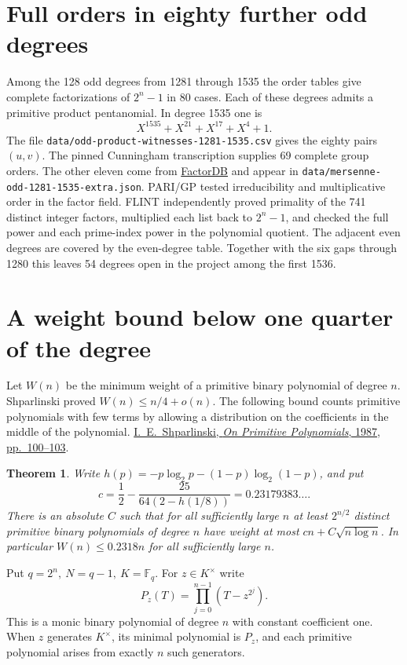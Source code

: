 \documentclass[11pt]{article}
\newtheorem{theorem}{Theorem}
\begin{document}
\section{Full orders in eighty further odd degrees}\label{sec:odd-1535}
Among the 128 odd degrees from 1281 through 1535 the order tables
give complete factorizations of \(2^n-1\) in 80 cases. Each of these
degrees admits a primitive product pentanomial. In degree 1535 one is
\[
                   X^{1535}+X^{21}+X^{17}+X^4+1 .
\]
The file \nolinkurl{data/odd-product-witnesses-1281-1535.csv} gives the
eighty pairs \((u,v)\). The pinned Cunningham transcription supplies
69 complete group orders. The other eleven come from
\href{https://factordb.com/index.php?query=2%5E1535-1}{FactorDB}
and appear in \nolinkurl{data/mersenne-odd-1281-1535-extra.json}.
PARI/GP tested irreducibility and multiplicative order in the factor
field. FLINT independently proved primality of the 741 distinct
integer factors, multiplied each list back to \(2^n-1\), and checked
the full power and each prime-index power in the polynomial quotient.
The adjacent even degrees are covered by the even-degree table.
Together with the six gaps through 1280 this leaves 54 degrees open
in the project among the first 1536.

\section{A weight bound below one quarter of the degree}\label{sec:weight-quarter}
Let \(W(n)\) be the minimum weight of a primitive binary polynomial of
degree \(n\). Shparlinski proved \(W(n)\le n/4+o(n)\).
The following bound counts primitive polynomials with few terms by
allowing a distribution on the coefficients in the middle of the polynomial.
\href{https://www.mathnet.ru/eng/ppi820}{I.~E.~Shparlinski,
\emph{On Primitive Polynomials}, 1987, pp.~100--103}.

\begin{theorem}\label{thm:primitive-weight-quarter}
Write \(h(p)=-p\log_2p-(1-p)\log_2(1-p)\), and put
\[
 c=\frac12-\frac{25}{64(2-h(1/8))}=0.23179383\ldots .
\]
There is an absolute \(C\) such that for all sufficiently large \(n\)
at least \(2^{n/2}\) distinct primitive binary polynomials of degree
\(n\) have weight at most \(cn+C\sqrt{n\log n}\).
In particular \(W(n)\le 0.2318n\) for all sufficiently large \(n\).
\end{theorem}

Put \(q=2^n,\ N=q-1,\ K=\mathbb F_q\). For \(z\in K^\times\) write
\[
 P_z(T)=\prod_{j=0}^{n-1}(T-z^{2^j}).
\]
This is a monic binary polynomial of degree \(n\) with constant
coefficient one. When \(z\) generates \(K^\times\), its minimal
polynomial is \(P_z\), and each primitive polynomial arises from
exactly \(n\) such generators.
\end{document}
